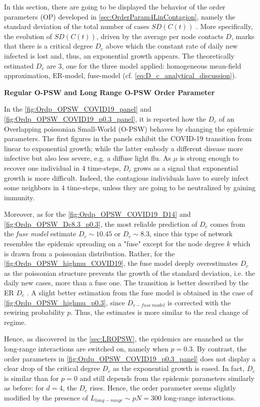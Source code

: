 \documentclass[a4paper,10pt,twoside]{book} %
\theoremstyle{definition}
\begin{document}
In this section, there are going to be displayed the behavior of the order parameters (OP) developed in \autoref{sec:OrderParam4LinContagion}, namely the standard deviation of the total number of cases $SD(C(t))$ . More specifically, the evolution of $SD(C(t))$, driven by the average per node contacts $D$, marks that there is a critical degree $D_c$ above which the constant rate of daily new infected is lost and, thus, an exponential growth appears. The theoretically estimated $D_c$ are 3, one for the three model applied: homogeneous mean-field approximation, ER-model, fuse-model (cf. \autoref{eq:D_c_analytical_discussion}).

\textbf{Regular O-PSW and Long Range O-PSW Order Parameter}

In the \autoref{fig:Ordp_OPSW_COVID19_panel} and \autoref{fig:Ordp_OPSW_COVID19_p0.3_panel}, it is reported how the $D_c$ of an Overlapping poissonian Small-World (O-PSW) behaves by changing the epidemic parameters. The first figures in the panels exhibit the COVID-19 transition from linear to exponential growth; while the latter embody a different disease more infective but also less severe, e.g. a diffuse light flu. As $ \mu$ is strong enough to recover one individual in $ 4$  time-steps, $D_c$ grows as a signal that exponential growth is more difficult. Indeed, the contagious individuals have to surely infect some neighbors in $4$ time-steps, unless they are going to be neutralized by gaining immunity.  

Moreover, as for the \autoref{fig:Ordp_OPSW_COVID19_D14} and \autoref{fig:Ordp_OPSW_Dc8.3_p0.3}, the most reliable prediction of $ D_c$ comes from the \textit{fuse model} estimate $ D_c \sim 10.45$ or $ D_c \sim 8.3$, since this type of network resembles the epidemic spreading on a "fuse" except for the node degree $ k$ which is drawn from a poissonian distribution.
Rather, for the \autoref{fig:Ordp_OPSW_highmu_COVID19}, the fuse model deeply overestimates $ D_c$ as the poissonian structure prevents the growth of the standard deviation, i.e. the daily new cases, more than a fuse one. The transition is better described by the ER $ D_c$ .
A slight better estimation from the fuse model is obtained in the case of \autoref{fig:Ordp_OPSW_highmu_p0.3}, since $ D_{c-fuse \, model}$  is corrected with the rewiring probability $ p$. Thus, the estimates is more similar to the real change of regime.

Hence, as discovered in the \autoref{sec:LROPSW}, the epidemics are enanched as the long-range interactions are switched on, namely when $ p=0.3$. By contrast, the order parameters in \autoref{fig:Ordp_OPSW_COVID19_p0.3_panel} does not display a clear drop of the critical degree $ D_c$ as the exponential growth is eased.  In fact, $D_c$ is similar than for $ p=0$ and still depends from the epidemic parameters similarly as before: for $d = 4$, the $ D_c$ rises. Hence, the order parameter seems slightly modified by the presence of $L_{long-range} \sim pN = 300$ long-range interactions.
\end{document}
